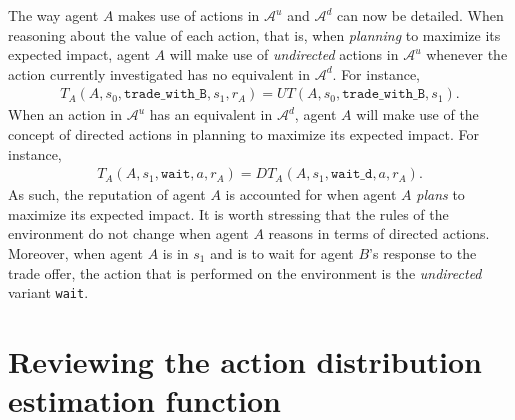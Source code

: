 The way agent $A$ makes use of actions in $\mathcal{A}^u$ and $\mathcal{A}^d$ can now be detailed.
When reasoning about the value of each action, that is, when \textit{planning} to maximize its expected impact, agent $A$ will make use of \textit{undirected} actions in $\mathcal{A}^u$ whenever the action currently investigated has no equivalent in $\mathcal{A}^d$. For instance,
    \begin{align}
        T_A(A, s_0, \texttt{trade\_with\_B}, s_1, r_A) = UT(A, s_0, \texttt{trade\_with\_B}, s_1).
    \end{align}
    When an action in $\mathcal{A}^u$ has an equivalent in $\mathcal{A}^d$, agent $A$ will make use of the concept of directed actions in planning to maximize its expected impact. For instance,
    \begin{align}
        T_A(A, s_1, \texttt{wait}, a, r_A) = DT_A(A, s_1, \texttt{wait\_d}, a, r_A). 
    \end{align}
As such, the reputation of agent $A$ is accounted for when agent $A$ \textit{plans} to maximize its expected impact.
It is worth stressing that the rules of the environment do not change when agent $A$ reasons in terms of directed actions. Moreover, when agent $A$ is in $s_1$ and is to wait for agent $B$'s response to the trade offer, the action that is performed on the environment is the \textit{undirected} variant \texttt{wait}.










\section{Reviewing the action distribution estimation function}
\label{sec:revv}


